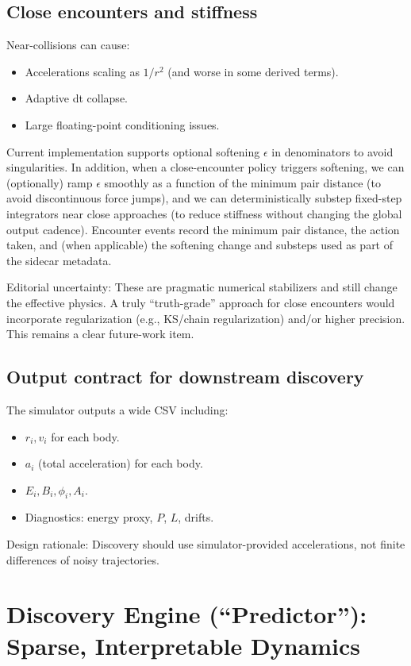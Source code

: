 \documentclass[11pt]{article}
\begin{document}
\subsection{Close encounters and stiffness}
Near-collisions can cause:
\begin{itemize}
\item Accelerations scaling as $1/r^2$ (and worse in some derived terms).
\item Adaptive dt collapse.
\item Large floating-point conditioning issues.
\end{itemize}

Current implementation supports optional softening $\epsilon$ in denominators to avoid singularities. In addition, when a close-encounter policy triggers softening, we can (optionally) ramp $\epsilon$ smoothly as a function of the minimum pair distance (to avoid discontinuous force jumps), and we can deterministically substep fixed-step integrators near close approaches (to reduce stiffness without changing the global output cadence). Encounter events record the minimum pair distance, the action taken, and (when applicable) the softening change and substeps used as part of the sidecar metadata.

Editorial uncertainty: These are pragmatic numerical stabilizers and still change the effective physics. A truly ``truth-grade'' approach for close encounters would incorporate regularization (e.g., KS/chain regularization)\cite{KustaanheimoStiefel1965,MikkolaAarseth1993} and/or higher precision. This remains a clear future-work item.

\subsection{Output contract for downstream discovery}
The simulator outputs a wide CSV including:
\begin{itemize}
\item $r_i, v_i$ for each body.
\item $a_i$ (total acceleration) for each body.
\item $E_i, B_i, \phi_i, A_i$.
\item Diagnostics: energy proxy, $P$, $L$, drifts.
\end{itemize}

Design rationale: Discovery should use simulator-provided accelerations, not finite differences of noisy trajectories.

\section{Discovery Engine (``Predictor''): Sparse, Interpretable Dynamics}
\end{document}
